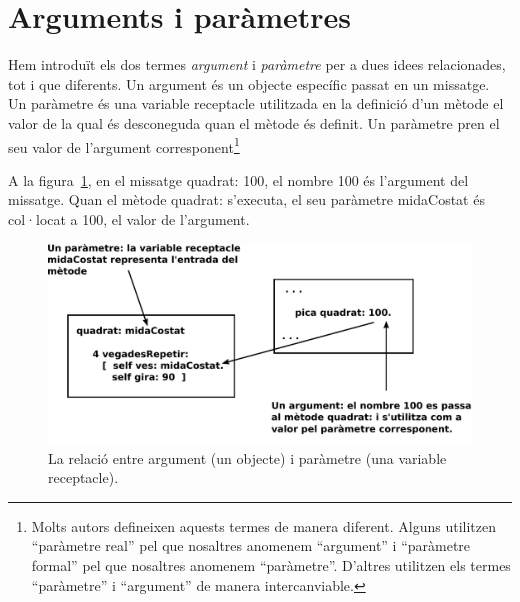 \section{Arguments i paràmetres}
Hem introduït els dos termes \emph{argument} i \emph{paràmetre} per a dues idees relacionades, tot i que diferents. Un argument és un objecte específic passat en un missatge. Un paràmetre és una variable receptacle utilitzada en la definició d'un mètode el valor de la qual és desconeguda quan el mètode és definit. Un paràmetre pren el seu valor de l'argument corresponent\footnote{Molts autors defineixen aquests termes de manera diferent. Alguns utilitzen ``paràmetre real'' pel que nosaltres anomenem ``argument'' i ``paràmetre formal'' pel que nosaltres anomenem ``paràmetre''. D'altres utilitzen els termes ``paràmetre'' i ``argument'' de manera intercanviable.}

A la figura~\ref{fig1402}, en el missatge \textsf{quadrat: 100}, el nombre \textsf{100} és l'argument del missatge. Quan el mètode \textsf{quadrat:} s'executa, el seu paràmetre \textsf{midaCostat} és col·locat a \textsf{100}, el valor de l'argument.
\begin{figure}[h]
\begin{center}
\includegraphics[scale=0.5]{Imatges/figura14-2.pdf}
\end{center}
\caption{La relació entre argument (un objecte) i paràmetre (una variable receptacle).}
\label{fig1402}
\end{figure}

